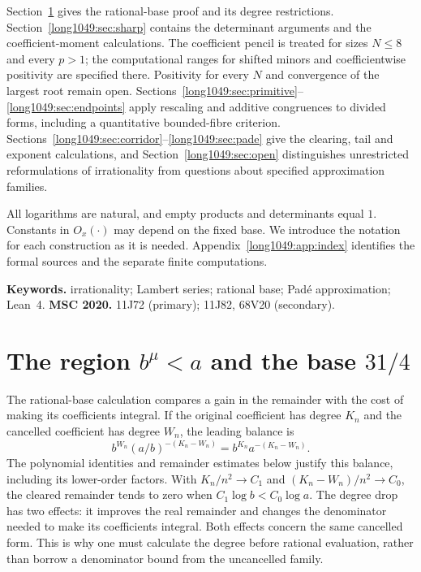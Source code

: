 Section~\ref{long1049:sec:region} gives the rational-base proof and
its degree restrictions. Section~\ref{long1049:sec:sharp} contains
the determinant arguments and the coefficient-moment calculations.
The coefficient pencil is treated for sizes $N\le8$ and every
$p>1$; the computational ranges for shifted minors and coefficientwise
positivity are specified there. Positivity for every $N$ and
convergence of the largest root remain open.
Sections~\ref{long1049:sec:primitive}--\ref{long1049:sec:endpoints}
apply rescaling and additive congruences to divided forms, including
a quantitative bounded-fibre criterion.
Sections~\ref{long1049:sec:corridor}--\ref{long1049:sec:pade} give
the clearing, tail and exponent calculations, and
Section~\ref{long1049:sec:open} distinguishes unrestricted
reformulations of irrationality from questions about specified
approximation families.

All logarithms are natural, and empty products and determinants
equal $1$. Constants in $O_x(\cdot)$ may depend on the fixed base.
We introduce the notation for each construction as it is needed.
Appendix~\ref{long1049:app:index} identifies the formal sources and
the separate finite computations.

\medskip
\noindent\textbf{Keywords.} irrationality; Lambert series; rational base;
Pad\'e approximation; Lean~4.
\qquad
\textbf{MSC 2020.} 11J72 (primary); 11J82, 68V20 (secondary).

\section{The region \texorpdfstring{$b^{\mu}<a$}{b\textasciicircum mu < a} and the base \texorpdfstring{$31/4$}{31/4}}\label{long1049:sec:region}

The rational-base calculation compares a gain in the remainder
with the cost of making its coefficients integral. If the original
coefficient has degree $K_n$ and the cancelled coefficient has
degree $W_n$, the leading balance is
\begin{equation}\label{long1049:eq:degree-balance}
 b^{W_n}(a/b)^{-(K_n-W_n)}
 =b^{K_n}a^{-(K_n-W_n)}.
\end{equation}
The polynomial identities and remainder estimates below justify
this balance, including its lower-order factors. With
$K_n/n^2\to C_1$ and $(K_n-W_n)/n^2\to C_0$, the cleared
remainder tends to zero when $C_1\log b<C_0\log a$.
The degree drop has two effects: it improves the real remainder
and changes the denominator needed to make its coefficients integral.
Both effects concern the same cancelled form. This is why one must
calculate the degree before rational evaluation, rather than borrow
a denominator bound from the uncancelled family.

